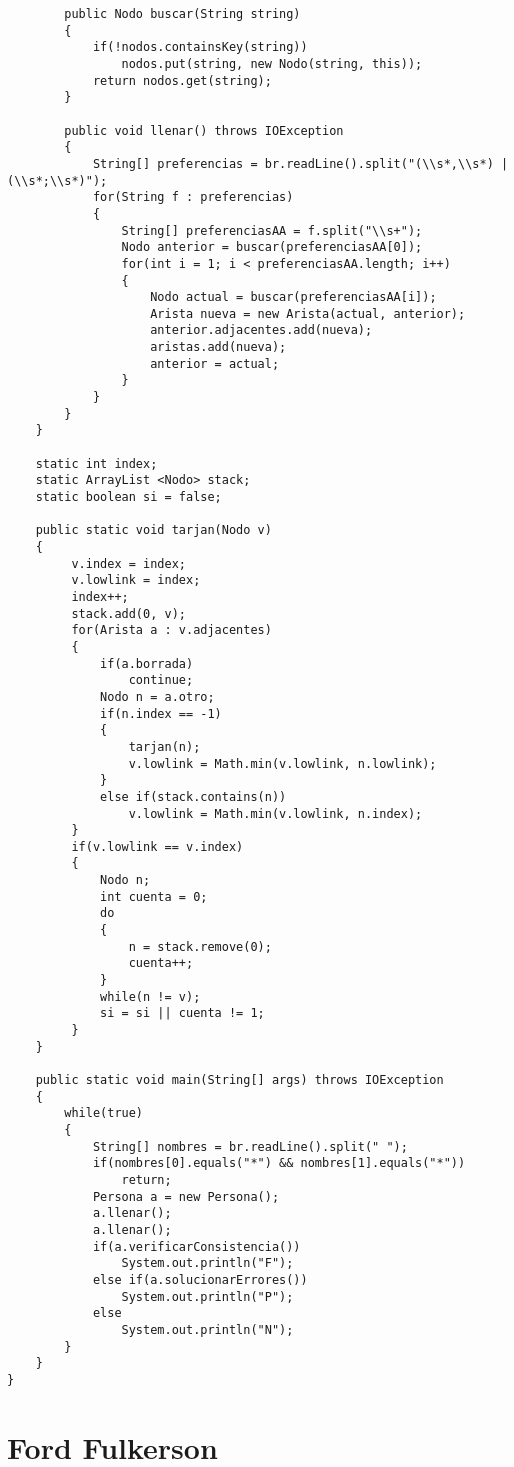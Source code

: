 \documentclass[a4paper, 11pt, oneside]{report}
\begin{document}
\begin{verbatim}
		public Nodo buscar(String string) 
		{
			if(!nodos.containsKey(string))
				nodos.put(string, new Nodo(string, this));
			return nodos.get(string);
		}
		
		public void llenar() throws IOException
		{
			String[] preferencias = br.readLine().split("(\\s*,\\s*) | (\\s*;\\s*)");
			for(String f : preferencias)
			{
				String[] preferenciasAA = f.split("\\s+");
				Nodo anterior = buscar(preferenciasAA[0]);
				for(int i = 1; i < preferenciasAA.length; i++)
				{
					Nodo actual = buscar(preferenciasAA[i]);
					Arista nueva = new Arista(actual, anterior);
					anterior.adjacentes.add(nueva);
					aristas.add(nueva);
					anterior = actual;
				}	
			}
		}
	}
	
	static int index;
    static ArrayList <Nodo> stack;
    static boolean si = false;
	
	public static void tarjan(Nodo v)
	{
	     v.index = index;
	     v.lowlink = index;
	     index++;
	     stack.add(0, v);
	     for(Arista a : v.adjacentes)
	     {
	    	 if(a.borrada)
	    		 continue;
	    	 Nodo n = a.otro;
	    	 if(n.index == -1)
	    	 {
	    		 tarjan(n);
	    		 v.lowlink = Math.min(v.lowlink, n.lowlink);
	    	 }
	    	 else if(stack.contains(n))
	    		 v.lowlink = Math.min(v.lowlink, n.index);
	     }
	     if(v.lowlink == v.index)
	     {
	    	 Nodo n;
	    	 int cuenta = 0;
             do
             {
                 n = stack.remove(0);
                 cuenta++;
             }
             while(n != v);
             si = si || cuenta != 1;
	     }
	}
	
	public static void main(String[] args) throws IOException
	{
		while(true)
		{
			String[] nombres = br.readLine().split(" ");
			if(nombres[0].equals("*") && nombres[1].equals("*"))
				return;
			Persona a = new Persona();
			a.llenar();
			a.llenar();
			if(a.verificarConsistencia())
				System.out.println("F");	
			else if(a.solucionarErrores())
				System.out.println("P");	
			else
				System.out.println("N");
		}
	}
}

\end{verbatim}

\section{Ford Fulkerson}
\end{document}
